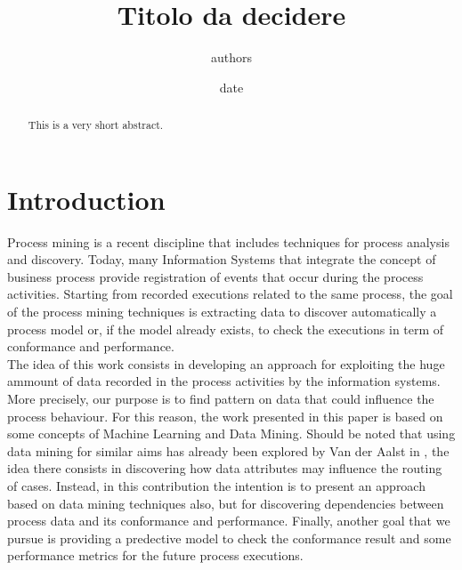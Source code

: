 \documentclass{llncs}
\title{Titolo da decidere}
\author{authors}
\date{date}
\begin{document}
\maketitle
\begin{abstract}
This is a very short abstract.
\end{abstract}

\section{Introduction}

Process mining is a recent discipline that includes techniques for process analysis and discovery. Today, many Information Systems that integrate the concept of business process provide registration of events that occur during the process activities. Starting from recorded executions related to the same process, the goal of the process mining techniques is extracting data to discover automatically a process model or, if the model already exists, to check the executions in term of conformance and performance.\\

The idea of this work consists in developing an approach for exploiting the huge ammount of data recorded in the process activities by the information systems. More precisely, our purpose is to find pattern on data that could influence the process behaviour. For this reason, the work presented in this paper is based on some concepts of Machine Learning and Data Mining. Should be noted that using data mining for similar aims has already been explored by Van der Aalst in \cite{}, the idea there consists in discovering how data attributes may influence the routing of cases. Instead, in this contribution the intention is to present an approach based on data mining techniques also, but for discovering dependencies between process data and its conformance and performance. Finally, another goal that we pursue is providing a predective model to check the conformance result and some performance metrics for the future process executions.  \\

\end{document}
